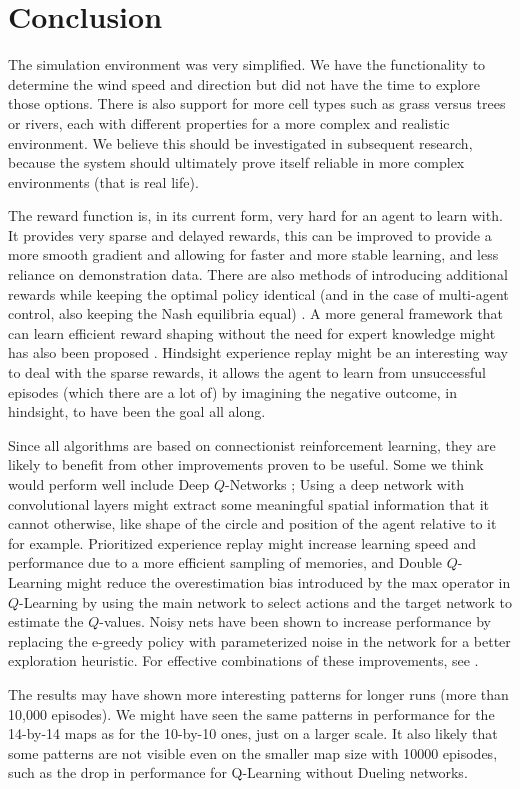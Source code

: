 
\section{Conclusion}\label{sec:conclusions}
The simulation environment was very simplified. We have the functionality to determine the wind speed and direction but did not have the time to explore those options. There is also support for more cell types such as grass versus trees or rivers, each with different properties for a more complex and realistic environment. We believe this should be investigated in subsequent research, because the system should ultimately prove itself reliable in more complex environments (that is real life).

The reward function is, in its current form, very hard for an agent to learn with. It provides very sparse and delayed rewards, this can be improved to provide a more smooth gradient and allowing for faster and more stable learning, and less reliance on demonstration data. There are also methods of introducing additional rewards while keeping the optimal policy identical (and in the case of multi-agent control, also keeping the Nash equilibria equal) \citep{ng1999policy}. A more general framework that can learn efficient reward shaping without the need for expert knowledge might has also been proposed \citep{zou2019reward}. Hindsight experience replay \citep{andrychowicz2017hindsight} might be an interesting way to deal with the sparse rewards, it allows the agent to learn from unsuccessful episodes (which there are a lot of) by imagining the negative outcome, in hindsight, to have been the goal all along.

Since all algorithms are based on connectionist reinforcement learning, they are likely to benefit from other improvements proven to be useful. Some we think would perform well include Deep $Q$-Networks \citep{mnih2015human}; Using a deep network with convolutional layers might extract some meaningful spatial information that it cannot otherwise, like shape of the circle and position of the agent relative to it for example. Prioritized experience replay \citep{schaul2015prioritized} might increase learning speed and performance due to a more efficient sampling of memories, and Double $Q$-Learning \citep{hasselt2010double} might reduce the overestimation bias introduced by the max operator in $Q$-Learning by using the main network to select actions and the target network to estimate the $Q$-values. Noisy nets \citep{fortunato2017noisy} have been shown to increase performance by replacing the e-greedy policy with parameterized noise in the network for a better exploration heuristic. For effective combinations of these improvements, see \cite{hessel2018rainbow}.

The results may have shown more interesting patterns for longer runs (more than 10,000 episodes). We might have seen the same patterns in performance for the 14-by-14 maps as for the 10-by-10 ones, just on a larger scale. It also likely that some patterns are not visible even on the smaller map size with 10000 episodes, such as the drop in performance for Q-Learning without Dueling networks.